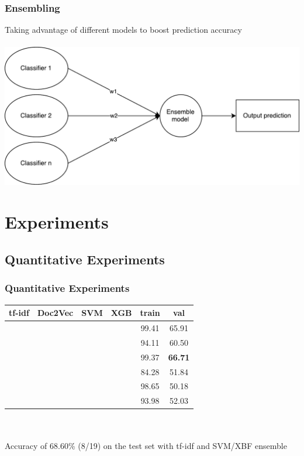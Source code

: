 \documentclass{beamer}
\newcommand{\cmark}{\ding{51}}%
\begin{document}
\begin{frame}
\frametitle{Ensembling}
Taking advantage of different models to boost prediction accuracy
\\~\\
\centering
\includegraphics[width=0.8\linewidth]{images/ensemble}

\end{frame}

\section{Experiments}

\subsection{Quantitative Experiments}

\begin{frame}
\frametitle{Quantitative Experiments}

\centering
\begin{tabular}{|c|c||c|c||c|c|}
\hline
tf-idf & Doc2Vec & SVM & XGB & train & val\\
\hline
\hline
\cmark & & \cmark & & 99.41 & 65.91 \\
\hline
\cmark & & & \cmark & 94.11 & 60.50 \\
\hline
\cmark & & \cmark & \cmark & 99.37 & \textbf{66.71} \\
\hline
\hline
& \cmark & \cmark & & 84.28 & 51.84 \\
\hline
& \cmark & & \cmark & 98.65 & 50.18 \\
\hline
& \cmark & \cmark & \cmark & 93.98 & 52.03 \\
\hline
\end{tabular}
\\~\\
Accuracy of 68.60\% (8/19) on the test set with tf-idf and SVM/XBF ensemble

\end{frame}
\end{document}
